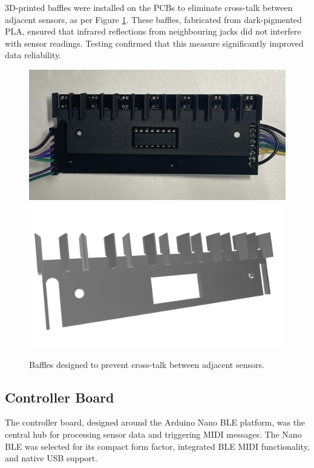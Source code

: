 3D-printed baffles were installed on the PCBs to eliminate cross-talk between adjacent sensors, as per Figure \ref{fig:baffles}. These baffles, fabricated from dark-pigmented PLA, ensured that infrared reflections from neighbouring jacks did not interfere with sensor readings. Testing confirmed that this measure significantly improved data reliability.


\begin{figure}
    \centering
    \includegraphics[width=\linewidth]{src/images/sensor-board-w-baffles.jpeg}
    \\
    \includegraphics[width=\linewidth]{src/images/baffles.png}
    \caption{Baffles designed to prevent cross-talk between adjacent sensors.}
    \label{fig:baffles}
\end{figure}
\subsection{Controller Board}\label{controller-board}

The controller board, designed around the Arduino Nano BLE platform, was the central hub for processing sensor data and triggering MIDI messages. The Nano BLE was selected for its compact form factor, integrated BLE MIDI functionality, and native USB support. 

